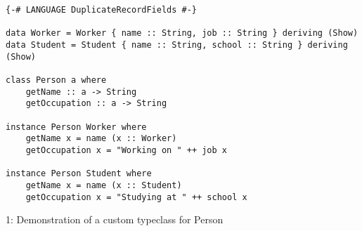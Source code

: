 \newpage
\begin{lstlisting}
{-# LANGUAGE DuplicateRecordFields #-}

data Worker = Worker { name :: String, job :: String } deriving (Show)
data Student = Student { name :: String, school :: String } deriving (Show)

class Person a where
    getName :: a -> String
    getOccupation :: a -> String

instance Person Worker where
    getName x = name (x :: Worker)
    getOccupation x = "Working on " ++ job x

instance Person Student where
    getName x = name (x :: Student)
    getOccupation x = "Studying at " ++ school x
\end{lstlisting}
\figurename{ 1: Demonstration of a custom typeclass for Person}
